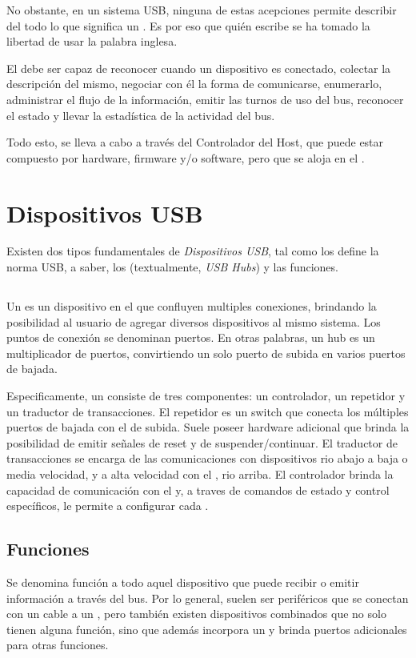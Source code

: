   No obstante, en un sistema USB, ninguna de estas acepciones permite describir
  del todo lo que significa un \host. Es por eso que quién escribe se ha tomado
  la libertad de usar la palabra inglesa.

  El \host debe ser capaz de reconocer cuando un dispositivo es conectado,
  colectar la descripción del mismo, negociar con él la forma de comunicarse,
  enumerarlo, administrar el flujo de la información, emitir las turnos de uso
  del bus, reconocer el estado y llevar la estadística de la actividad del bus.

  Todo esto, se lleva a cabo a través del Controlador del Host, que puede estar
  compuesto por hardware, firmware y/o software, pero que se aloja en el \host.

  \section{Dispositivos USB}
  Existen dos tipos fundamentales de {\it Dispositivos USB}, tal como los define
  la norma USB, a saber, los \hubs (textualmente, {\it USB Hubs}) y
  las funciones.

  \subsection{\Hub}
  Un \hub es un dispositivo en el que confluyen multiples conexiones, brindando
  la posibilidad al usuario de agregar diversos dispositivos al mismo sistema.
  Los puntos de conexión se denominan puertos. En otras palabras, un hub es
  un multiplicador de puertos, convirtiendo un solo puerto de subida en varios
  puertos de bajada.

  Especificamente, un  consiste de tres componentes: un controlador, un
  repetidor y un traductor de transacciones. El repetidor es un switch que
  conecta los múltiples puertos de bajada con el de subida. Suele poseer
  hardware adicional que brinda la posibilidad de emitir señales de reset y de
  suspender/continuar. El traductor de transacciones se encarga de las
  comunicaciones con dispositivos rio abajo a baja o media velocidad, y a alta
  velocidad con el \host, rio arriba. El controlador brinda la capacidad de
  comunicación con el \host y, a traves de comandos de estado y control
  específicos, le permite a \host configurar cada \hub.

  \subsection{Funciones}
  Se denomina función a todo aquel dispositivo que puede recibir o emitir
  información a través del bus. Por lo general, suelen ser periféricos que se
  conectan con un cable a un \hub, pero también existen dispositivos combinados
  que no solo tienen alguna función, sino que además incorpora un \hub y brinda
  puertos adicionales para otras funciones.

